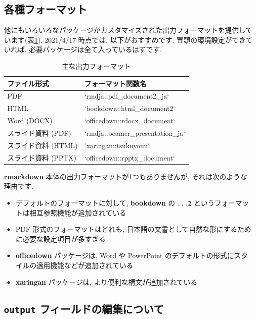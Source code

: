 \documentclass[
]{ltjsarticle}
\providecommand{\tightlist}{%
  \setlength{\itemsep}{0pt}\setlength{\parskip}{0pt}}
\begin{document}
\hypertarget{ux5404ux7a2eux30d5ux30a9ux30fcux30deux30c3ux30c8}{%
\subsection{各種フォーマット}\label{ux5404ux7a2eux30d5ux30a9ux30fcux30deux30c3ux30c8}}

他にもいろいろなパッケージがカスタマイズされた出力フォーマットを提供しています(表\ref{tab:format-tab}). 2021/4/17 時点では, 以下がおすすめです. 冒頭の環境設定ができていれば, 必要パッケージは全て入っているはずです.

\begin{table}

\caption{\label{tab:format-tab}主な出力フォーマット}
\centering
\begin{tabular}{ll}
\toprule
ファイル形式 & フォーマット関数名\\
\midrule
PDF & `rmdja::pdf\_document2\_ja`\\
HTML & `bookdown::html\_document2`\\
Word (DOCX) & `officedown::rdocx\_document`\\
スライド資料 (PDF) & `rmdja::beamer\_presentation\_ja`\\
スライド資料 (HTML) & `xaringan::tsukuyomi`\\
\addlinespace
スライド資料 (PPTX) & `officedown::rpptx\_document`\\
\bottomrule
\end{tabular}
\end{table}

\textbf{rmarkdown} 本体の出力フォーマットが1つもありませんが, それは次のような理由です.

\begin{itemize}
\tightlist
\item
  デフォルトのフォーマットに対して, \textbf{bookdown} の \texttt{...2} というフォーマットは相互参照機能が追加されている
\item
  PDF 形式のフォーマットはどれも, 日本語の文書として自然な形にするために必要な設定項目が多すぎる
\item
  \textbf{officedown} パッケージは, Word や PowerPoint のデフォルトの形式にスタイルの適用機能などが追加されている
\item
  \textbf{xaringan} パッケージは, より便利な構文が追加されている
\end{itemize}

\hypertarget{output-ux30d5ux30a3ux30fcux30ebux30c9ux306eux7de8ux96c6ux306bux3064ux3044ux3066}{%
\subsection{\texorpdfstring{\texttt{output} フィールドの編集について}{output フィールドの編集について}}\label{output-ux30d5ux30a3ux30fcux30ebux30c9ux306eux7de8ux96c6ux306bux3064ux3044ux3066}}
\end{document}
